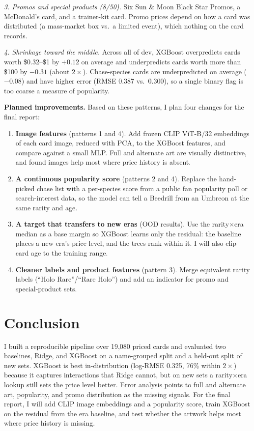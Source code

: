 \documentclass{article}
\begin{document}
\emph{3. Promos and special products (8/50).} Six Sun \& Moon Black Star Promos, a McDonald's card, and a trainer-kit card. Promo prices depend on how a card was distributed (a mass-market box vs.\ a limited event), which nothing on the card records.

\emph{4. Shrinkage toward the middle.} Across all of dev, XGBoost overpredicts cards worth \$0.32--\$1 by $+0.12$ on average and underpredicts cards worth more than \$100 by $-0.31$ (about $2\times$). Chase-species cards are underpredicted on average ($-0.08$) and have higher error (RMSE 0.387 vs.\ 0.300), so a single binary flag is too coarse a measure of popularity.

\textbf{Planned improvements.} Based on these patterns, I plan four changes for the final report:
\begin{enumerate}
    \item \textbf{Image features} (patterns 1 and 4). Add frozen CLIP ViT-B/32 embeddings of each card image, reduced with PCA, to the XGBoost features, and compare against a small MLP. Full and alternate art are visually distinctive, and \citet{mei2025art} found images help most where price history is absent.
    \item \textbf{A continuous popularity score} (patterns 2 and 4). Replace the hand-picked chase list with a per-species score from a public fan popularity poll or search-interest data, so the model can tell a Beedrill from an Umbreon at the same rarity and age.
    \item \textbf{A target that transfers to new eras} (OOD results). Use the rarity$\times$era median as a base margin so XGBoost learns only the residual: the baseline places a new era's price level, and the trees rank within it. I will also clip card age to the training range.
    \item \textbf{Cleaner labels and product features} (pattern 3). Merge equivalent rarity labels (``Holo Rare''/``Rare Holo'') and add an indicator for promo and special-product sets.
\end{enumerate}

\section{Conclusion}

I built a reproducible pipeline over 19{,}080 priced cards and evaluated two baselines, Ridge, and XGBoost on a name-grouped split and a held-out split of new sets. XGBoost is best in-distribution (log-RMSE 0.325, 76\% within $2\times$) because it captures interactions that Ridge cannot, but on new sets a rarity$\times$era lookup still sets the price level better. Error analysis points to full and alternate art, popularity, and promo distribution as the missing signals. For the final report, I will add CLIP image embeddings and a popularity score, train XGBoost on the residual from the era baseline, and test whether the artwork helps most where price history is missing.



\end{document}
